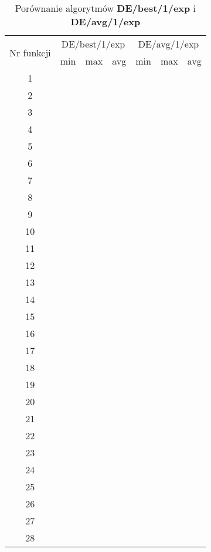 \documentclass[a4paper,12pt]{article}
\theoremstyle{definition}
\begin{document}
\begin{table}[H]
\centering
\def\arraystretch{1.3}
\setlength\tabcolsep{10pt}
\caption{Porównanie algorytmów \textbf{DE/best/1/exp} i \textbf{DE/avg/1/exp}}
\vspace{8pt}
\begin{tabular}{|c|c|c|c|c|c|c|}
	
	\hline
	\multirow{2}{*}{Nr funkcji} & \multicolumn{3}{c|}{DE/best/1/exp} & \multicolumn{3}{c|}{DE/avg/1/exp}\\
	\cline{2-7}
	& min & max & avg & min & max & avg\\
	\hline
	1 &  &  &  &  &  &  \\
	\hline
	2 &  &  &  &  &  &  \\
	\hline
	3 &  &  &  &  &  &  \\
	\hline
	4 &  &  &  &  &  &  \\
	\hline
	5 &  &  &  &  &  &  \\
	\hline
	6 &  &  &  &  &  &  \\
	\hline
	7 &  &  &  &  &  &  \\
	\hline
	8 &  &  &  &  &  &  \\
	\hline
	9 &  &  &  &  &  &  \\
	\hline
	10 &  &  &  &  &  &  \\
	\hline
	11 &  &  &  &  &  &  \\
	\hline
	12 &  &  &  &  &  &  \\
	\hline
	13 &  &  &  &  &  &  \\
	\hline
	14 &  &  &  &  &  &  \\
	\hline
	15 &  &  &  &  &  &  \\
	\hline
	16 &  &  &  &  &  &  \\
	\hline
	17 &  &  &  &  &  &  \\
	\hline
	18 &  &  &  &  &  &  \\
	\hline
	19 &  &  &  &  &  &  \\
	\hline
	20 &  &  &  &  &  &  \\
	\hline
	21 &  &  &  &  &  &  \\
	\hline
	22 &  &  &  &  &  &  \\
	\hline
	23 &  &  &  &  &  &  \\
	\hline
	24 &  &  &  &  &  &  \\
	\hline
	25 &  &  &  &  &  &  \\
	\hline
	26 &  &  &  &  &  &  \\
	\hline
	27 &  &  &  &  &  &  \\
	\hline
	28 &  &  &  &  &  &  \\
	\hline
\end{tabular}	
\end{table}
\end{document}

